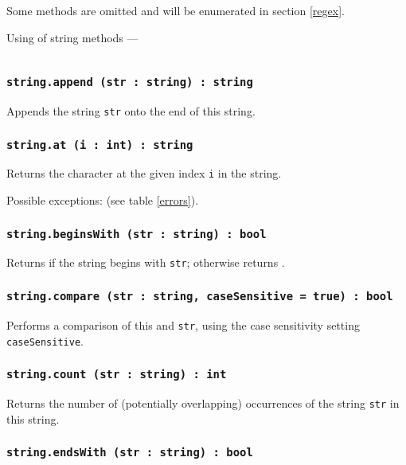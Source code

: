 Some methods are omitted and will be enumerated in section \ref{regex}.

\newpage
Using of string methods —
\inputminted[linenos]{icl}{../sources/stringmethods.icL}

\subsubsection{\texttt{string.append (str : string) : string}}

Appends the string \texttt{str} onto the end of this string.

\subsubsection{\texttt{string.at (i : int) : string}}

Returns the character at the given index \texttt{i} in the string.

Possible exceptions:  (see table \ref{errors}).

\subsubsection{\texttt{string.beginsWith (str : string) : bool}}

Returns \true{} if the string begins with \texttt{str}; otherwise returns \false.

\subsubsection{\texttt{string.compare (str : string, caseSensitive = true) : bool}}

Performs a comparison of this and \texttt{str}, using the case sensitivity setting \texttt{caseSensitive}.

\subsubsection{\texttt{string.count (str : string) : int}}

Returns the number of (potentially overlapping) occurrences of the string \texttt{str} in this string.

\subsubsection{\texttt{string.endsWith (str : string) : bool}}


